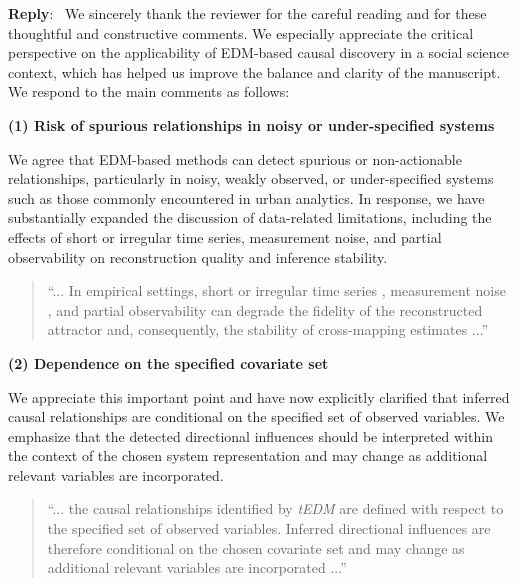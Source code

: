 \documentclass[11pt]{article}
\newcounter{reviewer}
\newcounter{point}[reviewer]
\newenvironment{reply}
   {\medskip \noindent \color{blue} \begin{sf}\textbf{Reply}:\  }
   {\medskip \par \end{sf}}
\begin{document}
\begin{reply}
We sincerely thank the reviewer for the careful reading and for these thoughtful and constructive comments. We especially appreciate the critical perspective on the applicability of EDM-based causal discovery in a social science context, which has helped us improve the balance and clarity of the manuscript. We respond to the main comments as follows:

\vspace{0.5em}

\textbf{(1) Risk of spurious relationships in noisy or under-specified systems}

We agree that EDM-based methods can detect spurious or non-actionable relationships, particularly in noisy, weakly observed, or under-specified systems such as those commonly encountered in urban analytics. In response, we have substantially expanded the discussion of data-related limitations, including the effects of short or irregular time series, measurement noise, and partial observability on reconstruction quality and inference stability.

\vspace{0.5em}

\begingroup
\color{red}\itshape
\begin{quote}
``... In empirical settings, short or irregular time series \citep{ma2014cms,clark2015multispatialccm}, measurement noise \citep{mnster2017ccm_performance}, and partial observability can degrade the fidelity of the reconstructed attractor and, consequently, the stability of cross-mapping estimates ...''
\end{quote}
\endgroup

\vspace{0.5em}

\textbf{(2) Dependence on the specified covariate set}

We appreciate this important point and have now explicitly clarified that inferred causal relationships are conditional on the specified set of observed variables. We emphasize that the detected directional influences should be interpreted within the context of the chosen system representation and may change as additional relevant variables are incorporated.

\vspace{0.5em}

\begingroup
\color{red}\itshape
\begin{quote}
``... the causal relationships identified by \textit{tEDM} are defined with respect to the specified set of observed variables. Inferred directional influences are therefore conditional on the chosen covariate set and may change as additional relevant variables are incorporated ...''
\end{quote}
\endgroup


\end{reply}
\end{document}
